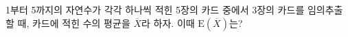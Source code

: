 1부터 5까지의 자연수가 각각 하나씩 적힌 5장의 카드 중에서 3장의 카드를 임의추출할 때, 카드에 적힌 수의 평균을 $\overline{X}$라 하자. 이때 $\mathrm{E}(\overline{X})$는?
